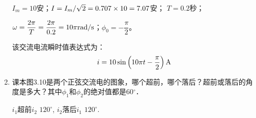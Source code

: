 \begin{enumerate}
    \begin{solution}
$I_m=10$安；$I=I_m/\sqrt{2}=0.707\times10=7.07$安；
$T=0.2$秒；

$\omega=\dfrac{2\pi}{T}=\dfrac{2\pi}{0.2}=10\pi{\rm rad/s}$；$\phi_0=-\dfrac{\pi}{2}$。

该交流电流瞬时值表达式为：
\[i=10\sin\left(10\pi t -\frac{\pi}{2}\right){\rm A}\]
    \end{solution}
    
    \item 课本图3.10是两个正弦交流电的图象，哪个超前，哪个落后？超前或落后的角度是多大？其中$\phi_1$和$\phi_2$的绝对值都是60$^\circ$．
    
\begin{solution}
$i_1$超前$i_2$ $120^{\circ}$, $i_2$落后$i_1$ $120^{\circ}$.
\end{solution}

\end{enumerate}


